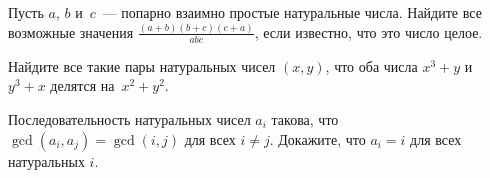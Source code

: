 \begin{problems}
\item
Пусть $a$, $b$ и~$c$~--- попарно взаимно простые натуральные числа.
Найдите все возможные значения $\frac{(a + b) (b + c) (c + a)}{a b c}$, если
известно, что это число целое.

\item
Найдите все такие пары натуральных чисел $(x, y)$, что оба числа
$x^3 + y$ и~$y^3 + x$ делятся на~$x^2 + y^2$.

\item
Последовательность натуральных чисел $a_{i}$ такова, что
$\gcd(a_{i}, a_{j}) = \gcd(i, j)$ для всех $i \neq j$.
Докажите, что $a_{i} = i$ для всех натуральных $i$.

\end{problems}

\endgroup %

